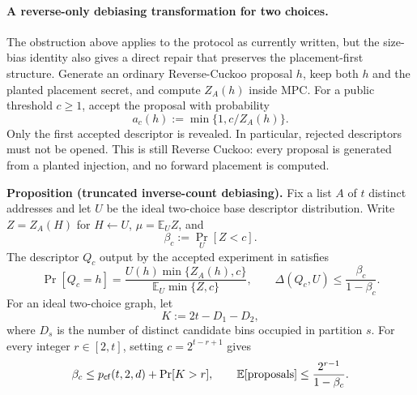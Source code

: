 \paragraph{A reverse-only debiasing transformation for two choices.}
The obstruction above applies to the protocol as currently written, but the
size-bias identity also gives a direct repair that preserves the
placement-first structure.  Generate an ordinary Reverse-Cuckoo proposal
$h$, keep both $h$ and the planted placement secret, and compute $Z_A(h)$
inside MPC.  For a public threshold $c\geq1$, accept the proposal with
probability
\begin{equation}\label{eq:rev-cuckoo-debias-accept}
 a_c(h):=\min\{1,c/Z_A(h)\}.
\end{equation}
Only the first accepted descriptor is revealed.  In particular, rejected
descriptors must not be opened.  This is still Reverse Cuckoo: every proposal
is generated from a planted injection, and no forward placement is computed.

\medskip
\noindent\textbf{Proposition (truncated inverse-count debiasing).}
Fix a list $A$ of $t$ distinct addresses and let $U$ be the ideal two-choice
base descriptor distribution.  Write $Z=Z_A(H)$ for $H\gets U$,
$\mu=\mathbb E_U Z$, and
\[
 \beta_c:=\Pr_U[Z<c].
\]
The descriptor $Q_c$ output by the accepted experiment in
 satisfies
\begin{equation}\label{eq:rev-cuckoo-debias-distance}
 \Pr[Q_c=h]
 =\frac{U(h)\min\{Z_A(h),c\}}
        {\mathbb E_U\min\{Z,c\}},
 \qquad
 \Delta(Q_c,U)\leq\frac{\beta_c}{1-\beta_c}.
\end{equation}
For an ideal two-choice graph, let
\[
 K:=2t-D_1-D_2,
\]
where $D_s$ is the number of distinct candidate bins occupied in partition
$s$.  For every integer $r\in[2,t]$, setting $c=2^{t-r+1}$ gives
\begin{equation}\label{eq:rev-cuckoo-debias-tail}
 \beta_c
 \leq p_{\mathsf{cf}}(t,2,d)+\Pr[K>r],
 \qquad
 \mathbb E[\textnormal{proposals}]
 \leq\frac{2^{r-1}}{1-\beta_c}.
\end{equation}

